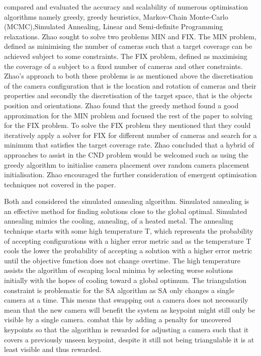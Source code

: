 \citet{zhao2013approximate} compared and evaluated the accuracy and scalability of numerous optimisation algorithms namely greedy, greedy heuristics, Markov-Chain Monte-Carlo (MCMC),Simulated Annealing, Linear and Semi-definite Programming relaxations. Zhao sought to solve two problems MIN and FIX.
The MIN problem, defined as minimising the number of cameras such that a target coverage can be achieved subject to some constraints.
The FIX problem, defined as maximising the coverage of a subject to a fixed number of cameras and other constraints. 
Zhao's approach to both these problems is as mentioned above the discretisation of the camera configuration that is the location and rotation of cameras and their properties and secondly the discretisation of the target space, that is the objects position and orientations.
Zhao found that the greedy method found a good approximation for the MIN problem and focused the rest of the paper to solving for the FIX problem. To solve the FIX problem they mentioned that they could iteratively apply a solver for FIX for different number of cameras and search for a minimum that satisfies the target coverage rate. 
Zhao concluded that a hybrid of approaches to assist in the CND problem would be welcomed such as using the greedy algorithm to initialise camera placement over random camera placement initialisation. Zhao encouraged the further consideration of emergent optimisation techniques not covered in the paper. 

Both \citet{zhao2013approximate} and \citet{rahimian2016optimal} considered the simulated annealing algorithm. Simulated annealing is an effective method for finding solutions close to the global optimal. Simulated annealing mimics the cooling, annealing, of a heated metal. The annealing technique starts with some high temperature T, which represents the probability of accepting configurations with a higher error metric and as the temperature T cools the lower the probability of accepting a solution with a higher error metric until the objective function does not change overtime. The high temperature assists the algorithm of escaping local minima by selecting worse solutions initially with the hopes of cooling toward a global optimum.
The triangulation constraint is problematic for the SA algorithm as SA only changes a single camera at a time. This means that swapping out a camera does not necessarily mean that the new camera will benefit the system as keypoint might still only be visible by a single camera. \citet{rahimian2016optimal} combat this by adding a penalty for uncovered keypoints so that the algorithm is rewarded for adjusting a camera such that it covers a previously unseen keypoint, despite it still not being triangulable it is at least visible and thus rewarded. 

